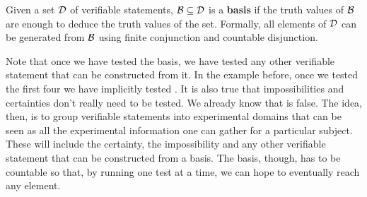 \documentclass[11pt,letterpaper,fleqn]{memoir} %
\begin{document}
\begin{mathSection}
	\begin{defn}
		Given a set $\mathcal{D}$ of verifiable statements, $\mathcal{B} \subseteq \mathcal{D}$ is a \textbf{basis} if the truth values of $\mathcal{B}$ are enough to deduce the truth values of the set. Formally, all elements of $\mathcal{D}$ can be generated from $\mathcal{B}$ using finite conjunction and countable disjunction.
	\end{defn}
\end{mathSection}

Note that once we have tested the basis, we have tested any other verifiable statement that can be constructed from it. In the example before, once we tested the first four we have implicitly tested . It is also true that impossibilities and certainties don't really need to be tested. We already know that  is false. The idea, then, is to group verifiable statements into experimental domains that can be seen as all the experimental information one can gather for a particular subject. These will include the certainty, the impossibility and any other verifiable statement that can be constructed from a basis. The basis, though, has to be countable so that, by running one test at a time, we can hope to eventually reach any element.
\end{document}

